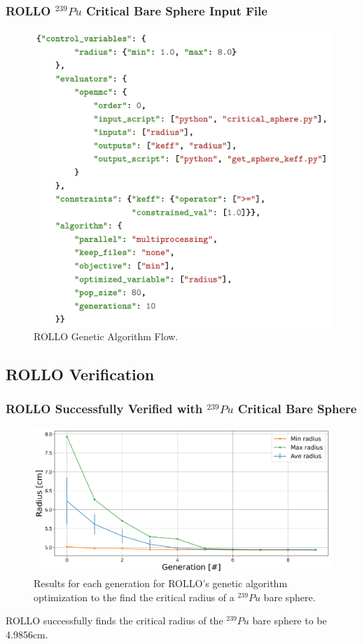 \begin{frame}
    \frametitle{ROLLO $^{239}Pu$ Critical Bare Sphere Input File}
    \begin{figure}
        \includegraphics[width=0.8\linewidth]{figures/rollo-verify-file.png} 
        \caption{ROLLO Genetic Algorithm Flow.}
    \end{figure}
\end{frame}

\subsection{ROLLO Verification}
\begin{frame}
    \frametitle{ROLLO Successfully Verified with $^{239}Pu$ Critical Bare Sphere}
    \begin{figure}
        \includegraphics[width=0.9\linewidth]{../docs/figures/radius-convergence.png} 
        \caption{Results for each generation for \gls{ROLLO}'s genetic algorithm 
        optimization to the find the critical radius of a  $^{239}Pu$ bare sphere.}
    \end{figure}
    ROLLO successfully finds the critical radius of the $^{239}Pu$ bare sphere to be 4.9856cm.
\end{frame}

